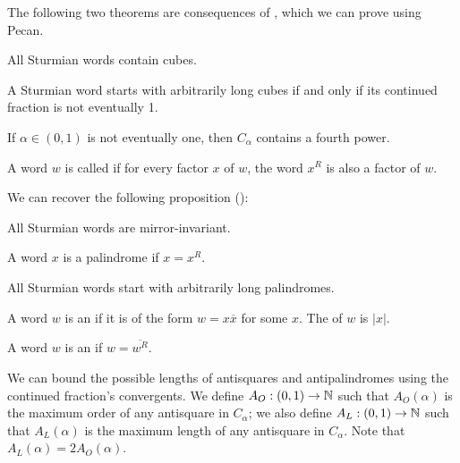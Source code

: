 \documentclass[a4paper,usenames,dvipsnames]{article}
\begin{document}
The following two theorems are consequences of \autocite[Theorem 4]{DAMANIK2003377}, which we can prove using Pecan.
\begin{theorem}
    All Sturmian words contain cubes.
\end{theorem}

\begin{theorem}
    A Sturmian word starts with arbitrarily long cubes if and only if its continued fraction is not eventually 1.
\end{theorem}

\begin{theorem}
    If $\alpha \in (0,1)$ is not eventually one, then $C_{\alpha}$ contains a fourth power.
\end{theorem}

\begin{definition}
    A word $w$ is called  if for every factor $x$ of $w$, the word $x^R$ is also a factor of $w$.
\end{definition}

We can recover the following proposition (\autocite[Proposition 2.1.19]{zbMATH01737190}):
\begin{theorem}
    All Sturmian words are mirror-invariant.
\end{theorem}

\begin{definition}
    A word $x$ is a palindrome if $x = x^R$.
\end{definition}
\begin{theorem}
    All Sturmian words start with arbitrarily long palindromes.
\end{theorem}

\begin{definition}
    A word $w$ is an  if it is of the form $w = x \overline{x}$ for some $x$.
    The  of $w$ is $|x|$.
\end{definition}

\begin{definition}
    A word $w$ is an  if $w = \overline{w^R}$.
\end{definition}

We can bound the possible lengths of antisquares and antipalindromes using the continued fraction's convergents.
We define $A_O : (0,1) \to \mathbb{N}$ such that $A_O(\alpha)$ is the maximum order of any antisquare in $C_{\alpha}$; we also define $A_L : (0,1) \to \mathbb{N}$ such that $A_L(\alpha)$ is the maximum length of any antisquare in $C_{\alpha}$.
Note that $A_L(\alpha) = 2A_O(\alpha)$.
\end{document}
